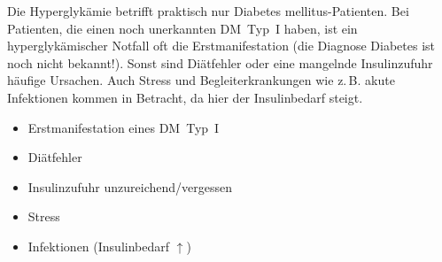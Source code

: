 {
Die Hyperglykämie betrifft praktisch nur Diabetes mellitus-Patienten. Bei
Patienten, die einen noch unerkannten DM~Typ~I haben, ist ein hyperglykämischer
Notfall oft die Erstmanifestation (die Diagnose Diabetes ist noch nicht
bekannt!). Sonst sind Diätfehler oder eine mangelnde Insulinzufuhr häufige
Ursachen. Auch Stress und Begleiterkrankungen wie z.\,B. akute Infektionen
kommen in Betracht, da hier der Insulinbedarf steigt.
}{
\begin{itemize}
  \item Erstmanifestation eines DM~Typ~I
  \item Diätfehler
  \item Insulinzufuhr unzureichend/vergessen
  \item Stress
  \item Infektionen (Insulinbedarf ${\uparrow}$)
\end{itemize}
}{}{}{}









